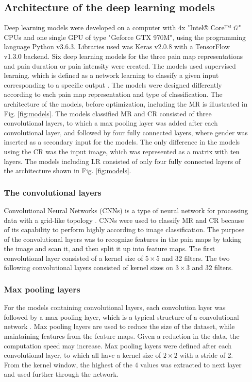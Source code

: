 \subsection{Architecture of the deep learning models}
Deep learning models were developed on a computer with 4x "Intel® Core™ i7" CPUs and one single GPU of type "Geforce GTX 970M", using the programming language Python v3.6.3. Libraries used was Keras v2.0.8 with a TensorFlow v1.3.0 backend.\newline
\noindent
Six deep learning models for the three pain map representations and pain duration or pain intensity were created. The models used supervised learning, which is defined as a network learning to classify a given input corresponding to a specific output \citep{Goodfellow2016}. The models were designed differently according to each pain map representation and type of classification. The architecture of the models, before optimization, including the MR is illustrated in Fig. \ref{fig:models}. The models classified MR and CR consisted of three convolutional layers, to which a max pooling layer was added after each convolutional layer, and followed by four fully connected layers, where gender was inserted as a secondary input for the models. The only difference in the models using the CR was the input image, which was represented as a matrix with ten layers. 
The models including LR consisted of only four fully connected layers of the architecture shown in Fig. \ref{fig:models}. 

\subsubsection{The convolutional layers}
Convolutional Neural Networks (CNNs) is a type of neural network for processing data with a grid-like topology \citep{Goodfellow2016}. CNNs were used to classify MR and CR because of its capability to perform highly according to image classification. The purpose of the convolutional layers was to recognize features in the pain maps by taking the image and scan it, and then split it up into feature maps.\citep{Goodfellow2016,LeCun1998} The first convolutional layer consisted of a kernel size of $5 \times 5$ and 32 filters. The two following convolutional layers consisted of kernel sizes on $3 \times 3$ and 32 filters. 

\subsubsection{Max pooling layers}
For the models containing convolutional layers, each convolution layer was followed by a max pooling layer, which is a typical structure of a convolutional network \citep{Goodfellow2016, LeCun2015}.
Max pooling layers are used to reduce the size of the dataset, while maintaining features from the feature maps. Given a reduction in the data, the computation speed may increase.\citep{Goodfellow2016,LeCun1998} 
Max pooling layers were defined after each convolutional layer, to which all have a kernel size of $2 \times 2$ with a stride of 2. From the kernel window, the highest of the 4 values was extracted to next layer and used further through the network. 

